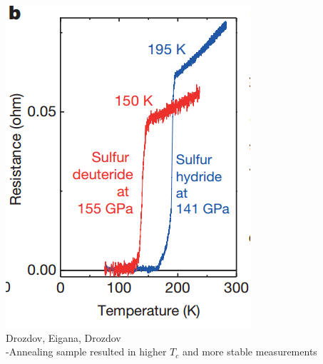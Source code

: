 \documentclass[amssymb,amsmath]{beamer}
\begin{document}
\begin{frame}
\includegraphics[scale=0.3]{./figures/isotope_drozdov.png}\\
Drozdov, Eigana, Drozdov \\

-Annealing sample resulted in higher $T_c$ and more stable measurements \\

\end{frame}
\end{document}
